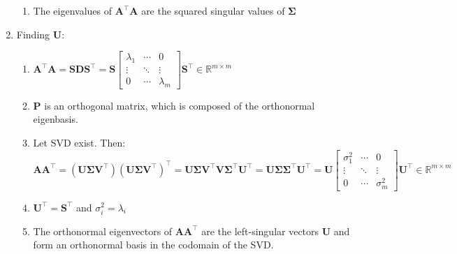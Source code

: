 \begin{enumerate}
\begin{enumerate}
        \item The eigenvalues of $\bm{A}^\top \bm{A}$ are the squared singular values of $\bm{\Sigma}$ 
        \hfill \cite{mfml/book/mml/Deisenroth-Faisal-Ong}
    \end{enumerate}

    \item Finding $\bm{U}$:
    \begin{enumerate}
        \item $
            \bm{A}^\top \bm{A} 
            = \bm{SDS} ^\top 
            = \bm{S} \begin{bmatrix}
                \lambda_1 & \cdots & 0 \\
                \vdots & \ddots & \vdots \\
                0 & \cdots & \lambda_m
            \end{bmatrix} \bm{S} ^\top  
            \in \mathbb{R}^{m\times m}
        $
        \hfill \cite{mfml/book/mml/Deisenroth-Faisal-Ong}

        \item $\bm{P}$ is an orthogonal matrix, which is composed of the orthonormal eigenbasis.
        \hfill \cite{mfml/book/mml/Deisenroth-Faisal-Ong}

        \item Let SVD exist. Then:
        \hfill \cite{mfml/book/mml/Deisenroth-Faisal-Ong}
        \\
        $
            \bm{A} \bm{A} ^\top
            = (\bm{U\Sigma V}^\top) (\bm{U\Sigma V}^\top) ^\top
            = \bm{U\Sigma V}^\top \bm{V} \bm{\Sigma}^\top \bm{U}^\top 
            = \bm{U} \bm{\Sigma} \bm{\Sigma}^\top \bm{U}^\top
            = \bm{U} \begin{bmatrix}
                \sigma_1^2 & \cdots & 0 \\
                \vdots & \ddots & \vdots \\
                0 & \cdots & \sigma_m^2
            \end{bmatrix} \bm{U} ^\top  
            \in \mathbb{R}^{m\times m}
        $
        \hfill \cite{mfml/book/mml/Deisenroth-Faisal-Ong}

        \item $\bm{U}^\top = \bm{S}^\top$ and $\sigma^2_i = \lambda_i$
        \hfill \cite{mfml/book/mml/Deisenroth-Faisal-Ong}

        \item The orthonormal eigenvectors of $\bm{AA}^\top$ are the left-singular vectors $\bm{U}$ and form an orthonormal basis in the codomain of the SVD.
        \hfill \cite{mfml/book/mml/Deisenroth-Faisal-Ong}
    \end{enumerate}


\end{enumerate}
